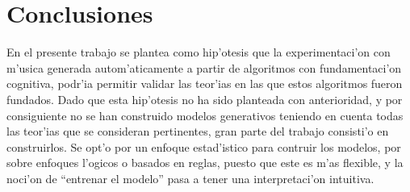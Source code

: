 \pagebreak
\section{Conclusiones}

%
%
%
%
%
%
%
%
%
%
%
%
%
%
%
%
%
%
%
%
%
%
%
%
%
%
%
%
%
%
%

En el presente trabajo se plantea como hip'otesis que la experimentaci'on con m'usica generada autom'aticamente a partir de 
algoritmos con fundamentaci'on cognitiva, podr'ia permitir validar las teor'ias en las que estos algoritmos fueron fundados. 
Dado que esta hip'otesis no ha sido planteada con anterioridad, y por consiguiente no se han construido modelos generativos 
teniendo en cuenta todas las teor'ias que se consideran pertinentes, gran parte del trabajo consisti'o en construirlos. 
Se opt'o por un enfoque estad'istico para contruir los modelos, por sobre enfoques l'ogicos o basados en reglas, puesto 
que este es m'as flexible, y la noci'on de ``entrenar el modelo'' pasa a tener una interpretaci'on intuitiva. 

